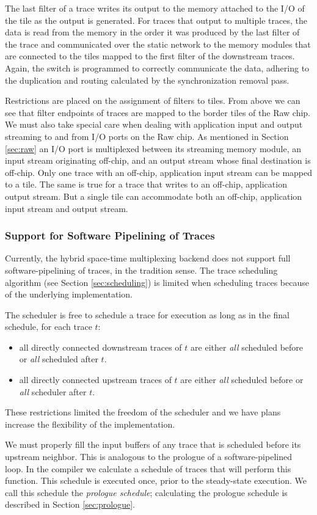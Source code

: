 The last filter of a trace writes its output to the memory attached to
the I/O of the tile as the output is generated. For traces that output
to multiple traces, the data is read from the memory in the order it
was produced by the last filter of the trace and communicated over the
static network to the memory modules that are connected to the tiles
mapped to the first filter of the downstream traces. Again, the switch
is programmed to correctly communicate the data, adhering to the
duplication and routing calculated by the synchronization removal
pass.

Restrictions are placed on the assignment of filters to tiles. From
above we can see that filter endpoints of traces are mapped to the
border tiles of the Raw chip. We must also take special care when
dealing with application input and output streaming to and from I/O
ports on the Raw chip.  As mentioned in Section \ref{sec:raw} an I/O
port is multiplexed between its streaming memory module, an input
stream originating off-chip, and an output stream whose final
destination is off-chip.  Only one trace with an off-chip, application
input stream can be mapped to a tile.  The same is true for a trace
that writes to an off-chip, application output stream.  But a single
tile can accommodate both an off-chip, application input stream and
output stream.

\subsubsection{Support for Software Pipelining of Traces}
\label{sec:softpipe}
Currently, the hybrid space-time multiplexing backend does not support
full software-pipelining of traces, in the tradition sense.  The trace
scheduling algorithm (see Section \ref{sec:scheduling}) is limited
when scheduling traces because of the underlying implementation.

The scheduler is free to schedule a trace for execution as long as in
the final schedule, for each trace $t$:
\begin{itemize}
\item all directly connected downstream traces of $t$ are either {\it all}
scheduled before or {\it all} scheduled after $t$.
\item all directly connected upstream traces of $t$ are either {\it all}
scheduled before or {\it all} scheduler after $t$.
\end{itemize}
These restrictions limited the freedom of the scheduler and we have
plans increase the flexibility of the implementation.

We must properly fill the input buffers of any trace that is scheduled
before its upstream neighbor.  This is analogous to the prologue of a
software-pipelined loop.  In the compiler we calculate a schedule of
traces that will perform this function.  This schedule is executed
once, prior to the steady-state execution.  We call this schedule the
{\it prologue schedule}; calculating the prologue schedule is
described in Section \ref{sec:prologue}.
